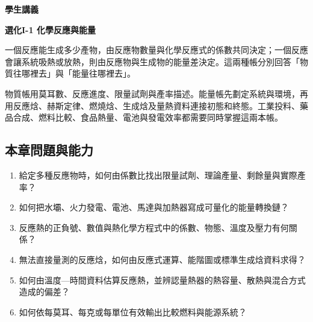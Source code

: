 \documentclass[11pt,a4paper]{article}
\providecommand{\tightlist}{%
  \setlength{\itemsep}{0pt}\setlength{\parskip}{0pt}}
\begin{document}
\begin{tcolorbox}[
  enhanced,colback=white,colframe=HandoutBlue,boxrule=1.1pt,arc=2mm,
  borderline west={3pt}{0pt}{HandoutBlue},left=5mm,right=4mm,top=4mm,bottom=4mm
]
{\sffamily\small\bfseries\color{HandoutBlue}學生講義}\par
{\sffamily\bfseries\LARGE\color{HandoutInk}選化I-1 化學反應與能量}\par
\vspace{0.35em}{\large 用粒子與莫耳帳決定產物上限，再用能量守恆、焓變與量熱資料追蹤反應能量}\par
{}\par
{}\par
\end{tcolorbox}


一個反應能生成多少產物，由反應物數量與化學反應式的係數共同決定；一個反應會讓系統吸熱或放熱，則由反應物與生成物的能量差決定。這兩種帳分別回答「物質往哪裡去」與「能量往哪裡去」。

物質帳用莫耳數、反應進度、限量試劑與產率描述。能量帳先劃定系統與環境，再用反應焓、赫斯定律、燃燒焓、生成焓及量熱資料連接初態和終態。工業投料、藥品合成、燃料比較、食品熱量、電池與發電效率都需要同時掌握這兩本帳。

\begin{HandoutLearningMap}

\subsection{本章問題與能力}\label{ux672cux7ae0ux554fux984cux8207ux80fdux529b}

\begin{enumerate}
\def\labelenumi{\arabic{enumi}.}
\tightlist
\item
  給定多種反應物時，如何由係數比找出限量試劑、理論產量、剩餘量與實際產率？
\item
  如何把水壩、火力發電、電池、馬達與加熱器寫成可量化的能量轉換鏈？
\item
  反應熱的正負號、數值與熱化學方程式中的係數、物態、溫度及壓力有何關係？
\item
  無法直接量測的反應焓，如何由反應式運算、能階圖或標準生成焓資料求得？
\item
  如何由溫度---時間資料估算反應熱，並辨認量熱器的熱容量、散熱與混合方式造成的偏差？
\item
  如何依每莫耳、每克或每單位有效輸出比較燃料與能源系統？
\end{enumerate}

\end{HandoutLearningMap}
\end{document}
